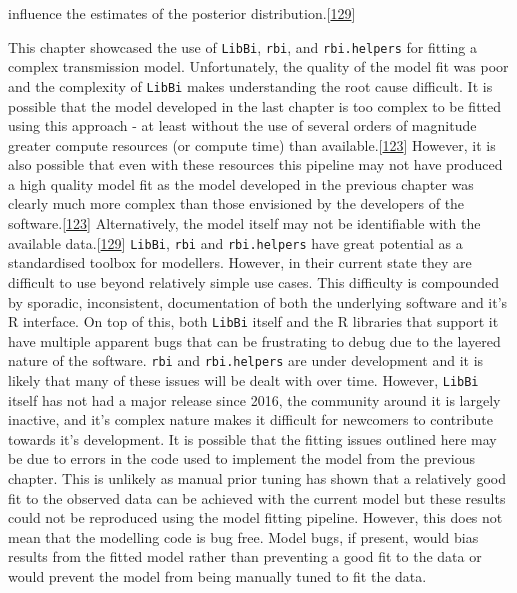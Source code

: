 \documentclass[11pt,twoside]{bristolthesis}
\begin{document}
influence the estimates of the posterior distribution.{[}\protect\hyperlink{ref-Lintusaari2016}{129}{]}
  
  This chapter showcased the use of \texttt{LibBi}, \texttt{rbi}, and \texttt{rbi.helpers} for fitting a complex transmission model. Unfortunately, the quality of the model fit was poor and the complexity of \texttt{LibBi} makes understanding the root cause difficult. It is possible that the model developed in the last chapter is too complex to be fitted using this approach - at least without the use of several orders of magnitude greater compute resources (or compute time) than available.{[}\protect\hyperlink{ref-Murray2015}{123}{]} However, it is also possible that even with these resources this pipeline may not have produced a high quality model fit as the model developed in the previous chapter was clearly much more complex than those envisioned by the developers of the software.{[}\protect\hyperlink{ref-Murray2015}{123}{]} Alternatively, the model itself may not be identifiable with the available data.{[}\protect\hyperlink{ref-Lintusaari2016}{129}{]} \texttt{LibBi}, \texttt{rbi} and \texttt{rbi.helpers} have great potential as a standardised toolbox for modellers. However, in their current state they are difficult to use beyond relatively simple use cases. This difficulty is compounded by sporadic, inconsistent, documentation of both the underlying software and it's R interface. On top of this, both \texttt{LibBi} itself and the R libraries that support it have multiple apparent bugs that can be frustrating to debug due to the layered nature of the software. \texttt{rbi} and \texttt{rbi.helpers} are under development and it is likely that many of these issues will be dealt with over time. However, \texttt{LibBi} itself has not had a major release since 2016, the community around it is largely inactive, and it's complex nature makes it difficult for newcomers to contribute towards it's development. It is possible that the fitting issues outlined here may be due to errors in the code used to implement the model from the previous chapter. This is unlikely as manual prior tuning has shown that a relatively good fit to the observed data can be achieved with the current model but these results could not be reproduced using the model fitting pipeline. However, this does not mean that the modelling code is bug free. Model bugs, if present, would bias results from the fitted model rather than preventing a good fit to the data or would prevent the model from being manually tuned to fit the data.
  
\end{document}
